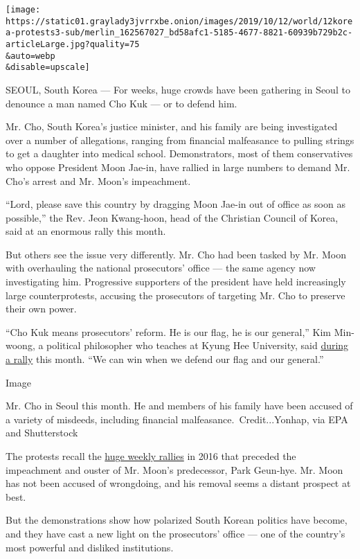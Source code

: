 \texttt{[image: https://static01.graylady3jvrrxbe.onion/images/2019/10/12/world/12korea-protests3-sub/merlin\_162567027\_bd58afc1-5185-4677-8821-60939b729b2c-articleLarge.jpg?quality=75\\\&auto=webp\\\&disable=upscale]}

SEOUL, South Korea --- For weeks, huge crowds have been gathering in
Seoul to denounce a man named Cho Kuk --- or to defend him.

Mr. Cho, South Korea's justice minister, and his family are being
investigated over a number of allegations, ranging from financial
malfeasance to pulling strings to get a daughter into medical school.
Demonstrators, most of them conservatives who oppose President Moon
Jae-in, have rallied in large numbers to demand Mr. Cho's arrest and Mr.
Moon's impeachment.

``Lord, please save this country by dragging Moon Jae-in out of office
as soon as possible,'' the Rev. Jeon Kwang-hoon, ​head of the Christian
Council of Korea​, said at an enormous rally this month.

But others see the issue very differently. Mr. Cho had been tasked by
Mr. Moon with overhauling the national prosecutors' office --- the same
agency now investigating him. Progressive supporters of the president
have held increasingly large counterprotests, accusing the prosecutors
of targeting Mr. Cho to preserve their own power.

``Cho Kuk means prosecutors' reform. He is our flag, he is our
general,'' Kim Min-woong, a political philosopher who teaches at Kyung
Hee University, said
\href{https://www.youtube.com/watch?v=d-bbuTfZuo4\&t=362s}{during a
rally} this month. ``We can win when we defend our flag and our
general.''

Image

Mr. Cho in Seoul this month. He and members of his family have been
accused of a variety of misdeeds, including financial
malfeasance.~Credit...Yonhap, via EPA and Shutterstock

The protests recall the
\href{https://www.nytimes3xbfgragh.onion/2016/11/13/world/asia/korea-park-geun-hye-protests.html}{huge
weekly rallies} in 2016 that preceded the impeachment and ouster of Mr.
Moon's predecessor, Park Geun-hye. Mr. Moon has not been accused of
wrongdoing, and his removal seems a distant prospect at best.

But the demonstrations show how polarized South Korean politics have
become, and they have cast a new light on the prosecutors' office ---
one of the country's most powerful and disliked institutions.

